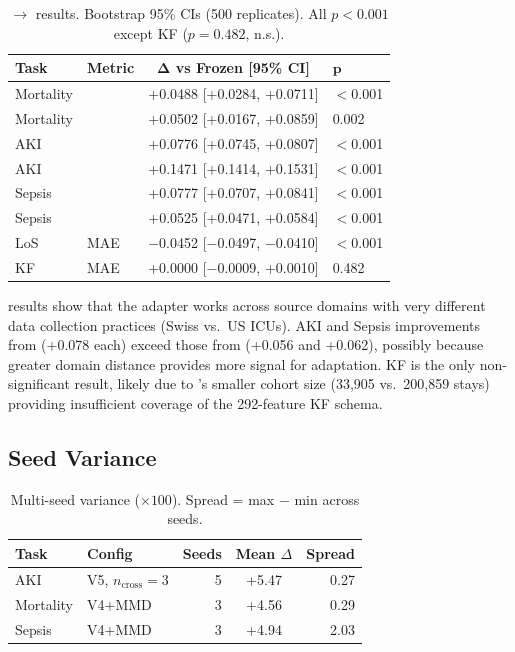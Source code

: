 \begin{table}[h]
\centering
\caption{\hirid{} $\to$ \mimic{} results. Bootstrap 95\% CIs (500 replicates). All $p < 0.001$ except KF ($p = 0.482$, n.s.).}
\label{tab:hirid}
\small
\begin{tabular}{@{}llcl@{}}
\toprule
\textbf{Task} & \textbf{Metric} & $\boldsymbol{\Delta}$ \textbf{vs Frozen} [95\% CI] & $\boldsymbol{p}$ \\
\midrule
Mortality & \aucroc{} & +0.0488 [+0.0284, +0.0711] & $<$0.001 \\
Mortality & \aucpr{}  & +0.0502 [+0.0167, +0.0859] & 0.002 \\
\addlinespace
AKI & \aucroc{} & +0.0776 [+0.0745, +0.0807] & $<$0.001 \\
AKI & \aucpr{}  & +0.1471 [+0.1414, +0.1531] & $<$0.001 \\
\addlinespace
Sepsis & \aucroc{} & +0.0777 [+0.0707, +0.0841] & $<$0.001 \\
Sepsis & \aucpr{}  & +0.0525 [+0.0471, +0.0584] & $<$0.001 \\
\addlinespace
LoS & MAE & $-$0.0452 [$-$0.0497, $-$0.0410] & $<$0.001 \\
\addlinespace
KF & MAE & +0.0000 [$-$0.0009, +0.0010] & 0.482 \\
\bottomrule
\end{tabular}
\end{table}

\hirid{} results show that the adapter works across source domains with very different data collection practices (Swiss vs.\ US ICUs).
AKI and Sepsis improvements from \hirid{} (+0.078 \aucroc{} each) exceed those from \eicu{} (+0.056 and +0.062), possibly because greater domain distance provides more signal for adaptation.
KF is the only non-significant result, likely due to \hirid{}'s smaller cohort size (33,905 vs.\ 200,859 stays) providing insufficient coverage of the 292-feature KF schema.

\subsection{Seed Variance}
\label{app:seed}

\begin{table}[h]
\centering
\caption{Multi-seed \aucroc{} variance ($\times 100$). Spread = max $-$ min across seeds.}
\label{tab:seed}
\small
\begin{tabular}{@{}llrcr@{}}
\toprule
\textbf{Task} & \textbf{Config} & \textbf{Seeds} & \textbf{Mean $\Delta$} & \textbf{Spread} \\
\midrule
AKI & V5, $n_\text{cross}=3$ & 5 & +5.47 & 0.27 \\
Mortality & V4+MMD & 3 & +4.56 & 0.29 \\
Sepsis & V4+MMD & 3 & +4.94 & 2.03 \\
\bottomrule
\end{tabular}
\end{table}

